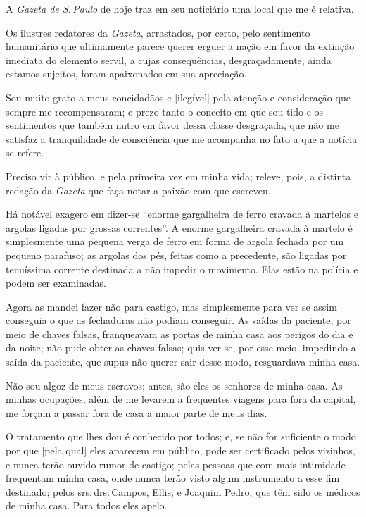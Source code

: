 A \emph{Gazeta de S.\,Paulo} de hoje traz em seu noticiário uma local que
me é relativa.

Os ilustres redatores da \emph{Gazeta}, arrastados, por certo, pelo
sentimento humanitário que ultimamente parece querer erguer a nação em
favor da extinção imediata do elemento servil, a cujas consequências,
desgraçadamente, ainda estamos sujeitos, foram apaixonados em sua
apreciação.

Sou muito grato a meus concidadãos e {[}ilegível{]} pela atenção e
consideração que sempre me recompensaram; e prezo tanto o conceito em
que sou tido e os sentimentos que também nutro em favor dessa classe
desgraçada, que não me satisfaz a tranquilidade de consciência que me
acompanha no fato a que a notícia se refere.

Preciso vir à público, e pela primeira vez em minha vida; releve, pois,
a distinta redação da \emph{Gazeta} que faça notar a paixão com que
escreveu.

Há notável exagero em dizer-se ``enorme gargalheira de ferro cravada à
martelos e argolas ligadas por grossas correntes''. A enorme gargalheira
cravada à martelo é simplesmente uma pequena verga de ferro em forma de
argola fechada por um pequeno parafuso; as argolas dos pés, feitas como
a precedente, são ligadas por tenuíssima corrente destinada a não impedir
o movimento. Elas estão na polícia e podem ser examinadas.

Agora as mandei fazer não para castigo, mas simplesmente para ver se
assim conseguia o que as fechaduras não podiam conseguir. As saídas da
paciente, por meio de chaves falsas, franqueavam as portas de minha casa
aos perigos do dia e da noite; não pude obter as chaves falsas; quis ver
se, por esse meio, impedindo a saída da paciente, que supus não querer
sair desse modo, resguardava minha casa.

Não sou algoz de meus escravos; antes, são eles os senhores de minha
casa. As minhas ocupações, além de me levarem a frequentes viagens para
fora da capital, me forçam a passar fora de casa a maior parte de meus
dias.

O tratamento que lhes dou é conhecido por todos; e, se não for
suficiente o modo por que {[}pela qual{]} eles aparecem em público, pode
ser certificado pelos vizinhos, e nunca terão ouvido rumor de castigo;
pelas pessoas que com mais intimidade frequentam minha casa, onde nunca
terão visto algum instrumento a esse fim destinado; pelos srs.\,drs.\,Campos, Ellis, e Joaquim Pedro, que têm sido os médicos de minha casa.
Para todos eles apelo.


